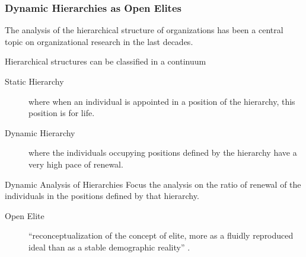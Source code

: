 \documentclass[ignorenonframetext,red,8pt,notes=hide]{beamer}
\begin{document}
\begin{frame}
\frametitle{Dynamic Hierarchies as Open Elites}

The analysis of the hierarchical structure of organizations has been a central topic on organizational research in the last decades.

\begin{block}{Hierarchical structures can be classified in a continuum}
\begin{description}
\item[Static Hierarchy] where when an individual is appointed in a position of the hierarchy, this position is for life.
\item[Dynamic Hierarchy] where the individuals occupying positions defined by the hierarchy have a very high pace of renewal.
\end{description}
\end{block}

\pause

\vspace{0.5cm}

\begin{block}{Dynamic Analysis of Hierarchies}
Focus the analysis on the ratio of renewal of the individuals in the positions defined by that hierarchy.

\begin{description}
\item[Open Elite] ``reconceptualization of the concept of elite, more as a fluidly reproduced ideal than as a stable demographic reality'' \citep[360]{padgett:2010}.
\end{description}

\end{block}


\end{frame}
\end{document}
